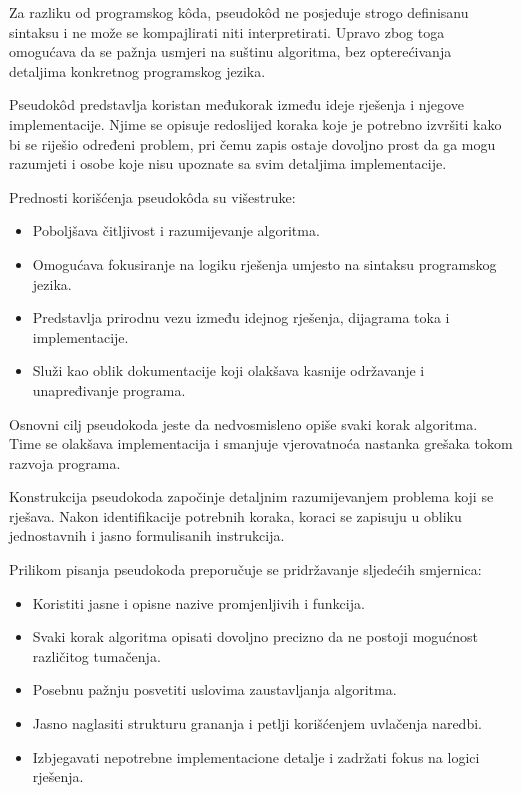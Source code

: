 Za razliku od programskog k\^oda, pseudok\^od ne posjeduje strogo definisanu sintaksu i ne može se kompajlirati niti interpretirati. Upravo zbog toga omogućava da se pažnja usmjeri na suštinu algoritma, bez opterećivanja detaljima konkretnog programskog jezika.

Pseudok\^od predstavlja koristan međukorak između ideje rješenja i njegove implementacije. Njime se opisuje redoslijed koraka koje je potrebno izvršiti kako bi se riješio određeni problem, pri čemu zapis ostaje dovoljno prost da ga mogu razumjeti i osobe koje nisu upoznate sa svim detaljima implementacije.

Prednosti korišćenja pseudok\^oda su višestruke:

\begin{itemize}
	\item Poboljšava čitljivost i razumijevanje algoritma.
	
	\item Omogućava fokusiranje na logiku rješenja umjesto na sintaksu programskog jezika.
	
	\item Predstavlja prirodnu vezu između idejnog rješenja, dijagrama toka i implementacije.
	
	\item Služi kao oblik dokumentacije koji olakšava kasnije održavanje i unapre\-đivanje programa.
	
\end{itemize}

Osnovni cilj pseudokoda jeste da nedvosmisleno opiše svaki korak algoritma. Time se olakšava implementacija i smanjuje vjerovatnoća nastanka grešaka tokom razvoja programa.

Konstrukcija pseudokoda započinje detaljnim razumijevanjem problema koji se rješava. Nakon identifikacije potrebnih koraka, koraci se zapisuju u obliku jednostavnih i jasno formulisanih instrukcija.

Prilikom pisanja pseudokoda preporučuje se pridržavanje sljedećih smjernica:

\begin{itemize}
	\item Koristiti jasne i opisne nazive promjenljivih i funkcija.
	
	\item Svaki korak algoritma opisati dovoljno precizno da ne postoji mogućnost različitog tumačenja.
	
	\item Posebnu pažnju posvetiti uslovima zaustavljanja algoritma.
	
	\item Jasno naglasiti strukturu grananja i petlji korišćenjem uvlačenja naredbi.
	
	\item Izbjegavati nepotrebne implementacione detalje i zadržati fokus na logici rješenja.
	
\end{itemize}

